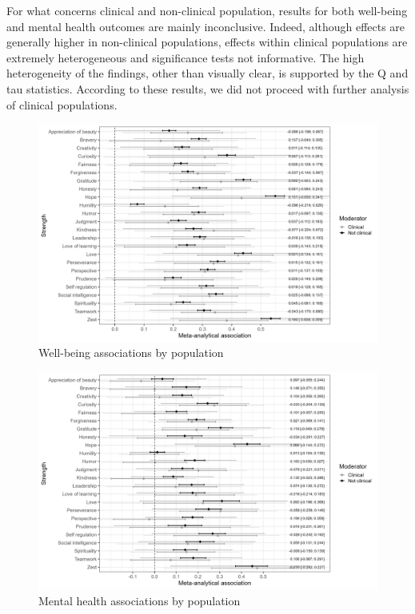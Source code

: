 \documentclass[
  letterpaper,
  DIV=11,
  numbers=noendperiod]{scrartcl}
\begin{document}
For what concerns clinical and non-clinical population, results for both
well-being and mental health outcomes are mainly inconclusive. Indeed,
although effects are generally higher in non-clinical populations,
effects within clinical populations are extremely heterogeneous and
significance tests not informative. The high heterogeneity of the
findings, other than visually clear, is supported by the Q and tau
statistics. According to these results, we did not proceed with further
analysis of clinical populations.

\begin{figure}

{\centering \includegraphics{Figures/WB.png}

}

\caption{Well-being associations by population}

\end{figure}

\begin{figure}

{\centering \includegraphics{Figures/MH.png}

}

\caption{Mental health associations by population}

\end{figure}
\end{document}
